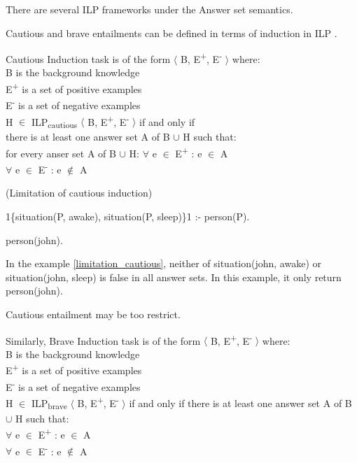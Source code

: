 \documentclass[12pt,twoside]{report}
\begin{document}
There are several ILP frameworks under the Answer set semantics.

Cautious and brave entailments can be defined in terms of induction in ILP \cite{Sakama2009}.


Cautious Induction task is of the form $\langle$ B, E\textsuperscript{+}, E\textsuperscript{-} $\rangle$ where: \\
B is the background knowledge \\
E\textsuperscript{+} is a set of positive examples \\
E\textsuperscript{-} is a set of negative examples \\

 H $\in$ ILP\textsubscript{cautious} $\langle$ B, E\textsuperscript{+}, E\textsuperscript{-} $\rangle$ if and only if  \\

 there is at least one answer set A of B $\cup$ H such that: \\
 for every anser set A of B $\cup$ H:
$\forall$ e $\in$ E\textsuperscript{+} : e $\in$ A \\
$\forall$ e $\in$ E\textsuperscript{-} : e $\notin$ A \\

\begin{examp} (Limitation of cautious induction)

1\{situation(P, awake), situation(P, sleep)\}1 :- person(P).

person(john).
\end{examp}
\label{limitation_cautious}

In the example \ref{limitation_cautious}, neither of situation(john, awake) or situation(john, sleep) is false in all answer sets. In this example, it only return person(john).

Cautious entailment may be too restrict.

Similarly, Brave Induction task is of the form $\langle$ B, E\textsuperscript{+}, E\textsuperscript{-} $\rangle$ where: \\
B is the background knowledge \\
E\textsuperscript{+} is a set of positive examples \\
E\textsuperscript{-} is a set of negative examples \\

 H $\in$ ILP\textsubscript{brave} $\langle$ B, E\textsuperscript{+}, E\textsuperscript{-} $\rangle$ if and only if there is at least one answer set A of B $\cup$ H such that: \\
$\forall$ e $\in$ E\textsuperscript{+} : e $\in$ A \\
$\forall$ e $\in$ E\textsuperscript{-} : e $\notin$ A \\
\end{document}
